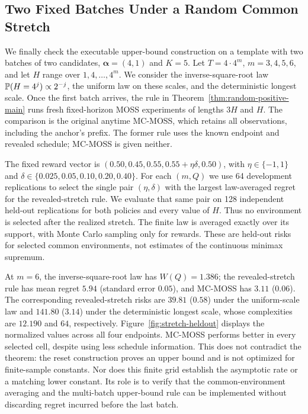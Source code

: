 \subsection{Two Fixed Batches Under a Random Common Stretch}
\label{sec:stretch-experiment}

We finally check the executable upper-bound construction on a template
with two batches of two candidates, $\boldsymbol\alpha=(4,1)$ and $K=5$.
Let $T=4\cdot4^m$, $m=3,4,5,6$, and let $H$ range over
$1,4,\ldots,4^m$.  We consider the inverse-square-root law
$\mathbb P(H=4^j)\propto2^{-j}$, the uniform law on these scales, and the
deterministic longest scale.  Once the first batch arrives, the rule in
Theorem~\ref{thm:random-positive-main} runs fresh fixed-horizon MOSS experiments
of lengths $3H$ and $H$.  The comparison is the original anytime MC-MOSS,
which retains all observations, including the anchor's prefix.  The
former rule uses the known endpoint and revealed schedule; MC-MOSS is
given neither.

The fixed reward vector is
$(0.50,0.45,0.55,0.55+\eta\delta,0.50)$, with
$\eta\in\{-1,1\}$ and
$\delta\in\{0.025,0.05,0.10,0.20,0.40\}$.
For each $(m,Q)$ we use 64 development replications to select the single
pair $(\eta,\delta)$ with the largest law-averaged regret for the
revealed-stretch rule.  We evaluate that same pair on 128 independent
held-out replications for both policies and every value of $H$.
Thus no environment is selected after the realized stretch.  The finite
law is averaged exactly over its support, with Monte Carlo sampling only
for rewards.  These are held-out risks for selected common environments,
not estimates of the continuous minimax supremum.



At $m=6$, the inverse-square-root law has $W(Q)=1.386$;
the revealed-stretch rule has mean regret $5.94$ (standard error $0.05$),
and MC-MOSS has $3.11$ ($0.06$).  The corresponding revealed-stretch risks
are $39.81$ ($0.58$) under the uniform-scale law and $141.80$ ($3.14$)
under the deterministic longest scale, whose complexities are $12.190$
and $64$, respectively.  Figure~\ref{fig:stretch-heldout} displays the
normalized values across all four endpoints.  MC-MOSS performs better
in every selected cell, despite using less schedule information.  This
does not contradict the theorem: the reset construction proves an
upper bound and is not optimized for finite-sample constants.  Nor does
this finite grid establish the asymptotic rate or a matching lower
constant.  Its role is to verify that the common-environment averaging
and the multi-batch upper-bound rule can be implemented without
discarding regret incurred before the last batch.


